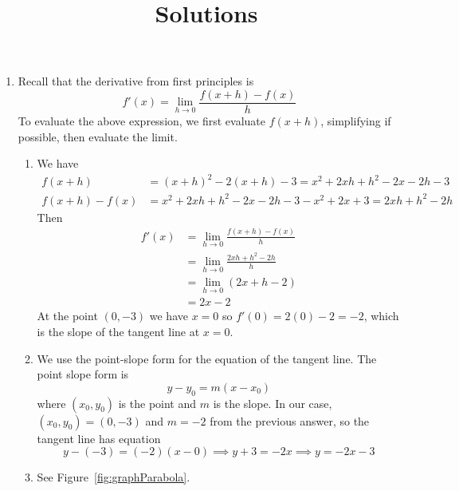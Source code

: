 \documentclass{article}
\title{\commonPSTitleZeroTwoOne\ Solutions}
\author{\commonAuthor}
\date{\commonDateZeroTwoOne}
\begin{document}
\maketitle
\begin{enumerate}
\item %
  Recall that the derivative from first principles is
  \begin{equation*}
    f'(x) = \lim_{h\to 0} \frac{f(x+h)-f(x)}{h}
  \end{equation*}
  To evaluate the above expression, we first evaluate $f(x+h)$,
  simplifying if possible, then evaluate the limit.
  \begin{enumerate}
  \item %
    We have
    \begin{align*}
      f(x+h) &= (x+h)^2 - 2(x+h) - 3
               = x^2 + 2xh + h^2 - 2x - 2h - 3
      \\
      f(x+h) - f(x) &= x^2 + 2xh + h^2 - 2x - 2h - 3 - x^2 + 2x + 3
                      = 2xh + h^2 - 2h
    \end{align*}
    Then
    \begin{align*}
      f'(x) &= \lim_{h\to 0} \frac{f(x+h)-f(x)}{h}
      \\
      &= \lim_{h\to 0} \frac{2xh + h^2 - 2h}{h}
      \\
      &= \lim_{h\to 0} (2x + h - 2)
      \\
      &= 2x - 2
    \end{align*}
    At the point $(0,-3)$ we have $x=0$ so $f'(0) = 2(0)-2 = -2$,
    which is the slope of the tangent line at $x=0$.
  \item %
    We use the point-slope form for the equation of the tangent line.
    The point slope form is
    \begin{equation*}
      y - y_0 = m(x-x_0)
    \end{equation*}
    where $(x_0,y_0)$ is the point and $m$ is the slope.  In our case,
    $(x_0,y_0)=(0,-3)$ and $m=-2$ from the previous answer, so the
    tangent line has equation
    \begin{equation*}
      y - (-3) = (-2) (x-0) \implies y + 3 = -2x \implies y = -2x - 3
    \end{equation*}
  \item %
    See Figure~\ref{fig:graphParabola}.
    \begin{figure}[htbp]
      \centering
\end{figure}
\end{enumerate}
\end{enumerate}
\end{document}
